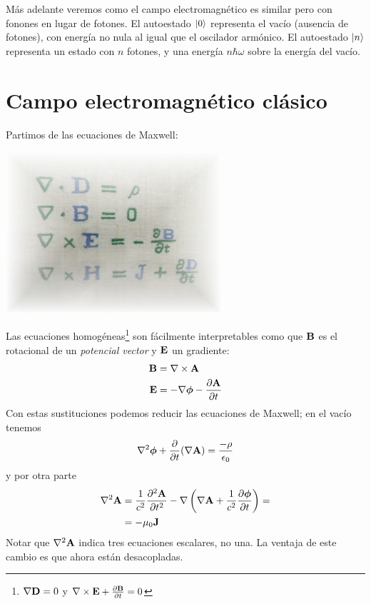 Más adelante veremos como el campo electromagnético es similar pero
con fonones en lugar de fotones. El autoestado $\ket{0}$ representa el
vacío (ausencia de fotones), con energía no nula al igual que el
oscilador armónico. El autoestado $\ket{n}$ representa un estado con
$n$ fotones, y una energía $n \hbar\omega$ sobre la energía del vacío.

\section{Campo electromagnético clásico}
Partimos de las ecuaciones de Maxwell:
\begin{center}
  \includegraphics[width=0.6\textwidth]{figures/maxwell.png}
\end{center}

Las ecuaciones homogéneas\footnote{$\nabla \bm{\mathrm{D}}=0$ y
  $\nabla\times \bm{\mathrm{E}} + \pdv{\bm{\mathrm{B}}}{t} = 0$} son fácilmente interpretables como que
$\bm{\mathrm{B}}$ es el rotacional de un \emph{potencial vector} y
$\bm{\mathrm{E}}$ un gradiente:
\begin{align}
    \bm{\mathrm{B}} &= \nabla \times \bm{\mathrm{A}} \\
  \bm{\mathrm{E}} &= -\nabla \bm{\mathrm{\phi}} - \pdv{\bm{\mathrm{A}}}{t}
\end{align}
Con estas sustituciones podemos reducir las ecuaciones de Maxwell; en el vacío tenemos
\begin{equation}
    \nabla^2 \bm{\mathrm{\phi}} + \pdv{t} (\nabla \bm{\mathrm{A}}) =
    \frac{-\rho}{\epsilon_0} 
\end{equation}
y por otra parte
\begin{equation}
  \begin{split}
    \nabla^2 \bm{\mathrm{A}} &= \frac{1}{c^2} \pdv[2]{\bm{\mathrm{A}}}{t} -
    \nabla \left( \nabla \bm{\mathrm{A}} + \frac{1}{c^2}
      \pdv{\bm{\mathrm{\phi}}}{t} \right) = \\
    &= -\mu_0 \bm{\mathrm{J}}
  \end{split}
  \label{eq:batman}
\end{equation}
Notar que $\nabla^2 \bm{\mathrm{A}}$ indica tres ecuaciones escalares, no
una. La ventaja de este cambio es que ahora están desacopladas.

